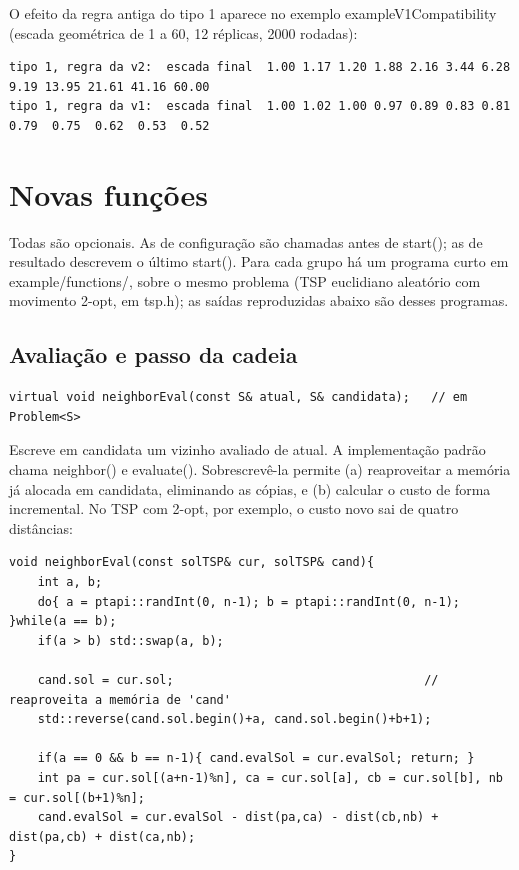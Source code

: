 \documentclass[10pt,a4paper]{article}
\newcommand{\code}[1]{{\ttfamily #1}}
\begin{document}
O efeito da regra antiga do tipo 1 aparece no exemplo \code{exampleV1Compatibility} (escada geométrica de 1 a 60, 12 réplicas, 2000 rodadas):

\begin{lstlisting}[style=saida]
tipo 1, regra da v2:  escada final  1.00 1.17 1.20 1.88 2.16 3.44 6.28 9.19 13.95 21.61 41.16 60.00
tipo 1, regra da v1:  escada final  1.00 1.02 1.00 0.97 0.89 0.83 0.81 0.79  0.75  0.62  0.53  0.52
\end{lstlisting}

\section{Novas funções}\label{s6}

Todas são opcionais. As de configuração são chamadas antes de \code{start()}; as de resultado descrevem o último \code{start()}. Para cada grupo há um programa curto em \code{example/\allowbreak{}functions/\allowbreak{}}, sobre o mesmo problema (TSP euclidiano aleatório com movimento 2-opt, em \code{tsp.h}); as saídas reproduzidas abaixo são desses programas.

\subsection{Avaliação e passo da cadeia}

\begin{lstlisting}[style=cpp]
virtual void neighborEval(const S& atual, S& candidata);   // em Problem<S>
\end{lstlisting}

Escreve em \code{candidata} um vizinho avaliado de \code{atual}. A implementação padrão chama \code{neighbor()} e \code{evaluate()}. Sobrescrevê-la permite (a) reaproveitar a memória já alocada em \code{candidata}, eliminando as cópias, e (b) calcular o custo de forma incremental. No TSP com 2-opt, por exemplo, o custo novo sai de quatro distâncias:

\begin{lstlisting}[style=cpp]
void neighborEval(const solTSP& cur, solTSP& cand){
    int a, b;
    do{ a = ptapi::randInt(0, n-1); b = ptapi::randInt(0, n-1); }while(a == b);
    if(a > b) std::swap(a, b);

    cand.sol = cur.sol;                                   // reaproveita a memória de 'cand'
    std::reverse(cand.sol.begin()+a, cand.sol.begin()+b+1);

    if(a == 0 && b == n-1){ cand.evalSol = cur.evalSol; return; }
    int pa = cur.sol[(a+n-1)%n], ca = cur.sol[a], cb = cur.sol[b], nb = cur.sol[(b+1)%n];
    cand.evalSol = cur.evalSol - dist(pa,ca) - dist(cb,nb) + dist(pa,cb) + dist(ca,nb);
}
\end{lstlisting}
\end{document}

